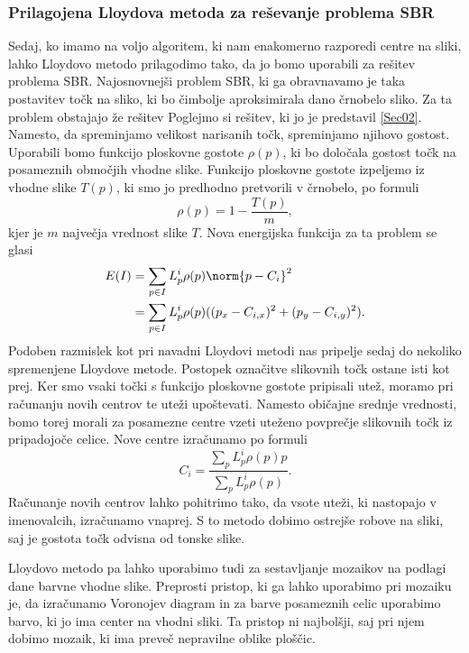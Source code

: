 \subsubsection{Prilagojena Lloydova metoda za reševanje problema SBR}
Sedaj, ko imamo na voljo algoritem, ki nam enakomerno razporedi centre na sliki, lahko Lloydovo metodo prilagodimo tako, da jo bomo uporabili za rešitev problema SBR. Najosnovnejši problem SBR, ki ga obravnavamo je taka postavitev točk na sliko, ki bo čimbolje aproksimirala dano črnobelo sliko. Za ta problem obstajajo že rešitev %
Poglejmo si rešitev, ki jo je predstavil \ref{Sec02}. Namesto, da spreminjamo velikost narisanih točk, spreminjamo njihovo gostost. Uporabili bomo funkcijo ploskovne gostote $\rho(p)$, ki bo določala gostost točk na posameznih območjih vhodne slike. Funkcijo ploskovne gostote izpeljemo iz vhodne slike $T(p)$, ki smo jo predhodno pretvorili v črnobelo, po formuli
$$\rho(p) = 1 - \frac{T(p)}{m},$$
kjer je $m$ največja vrednost slike $T$. Nova energijska funkcija za ta problem se glasi
%
\begin{align*}
E(I) & = \sum_{p \in I} L_p^i \rho(p) \norm{p - C_i}^2 \\
       & = \sum_{p \in I} L_p^i \rho(p) ((p_x - C_{i, x})^2 + (p_y - C_{i, y})^2).
\end{align*}
%
Podoben razmislek kot pri navadni Lloydovi metodi nas pripelje sedaj do nekoliko spremenjene Lloydove metode. Postopek označitve slikovnih točk ostane isti kot prej. Ker smo vsaki točki s funkcijo ploskovne gostote pripisali utež, moramo pri računanju novih centrov te uteži upoštevati. Namesto običajne srednje vrednosti, bomo torej morali za posamezne centre vzeti uteženo povprečje slikovnih točk iz pripadojoče celice. Nove centre izračunamo po formuli
%
$$C_i = \frac{\sum_p L_p^i \rho(p)p}{\sum_p L_p^i \rho(p)}.$$
%
Računanje novih centrov lahko pohitrimo tako, da vsote uteži, ki nastopajo v imenovalcih, izračunamo vnaprej. S to metodo dobimo ostrejše robove na sliki, saj je gostota točk odvisna od tonske slike. %

Lloydovo metodo pa lahko uporabimo tudi za sestavljanje mozaikov na podlagi dane barvne vhodne slike. Preprosti pristop, ki ga lahko uporabimo pri mozaiku je, da izračunamo Voronojev diagram in za barve posameznih celic uporabimo barvo, ki jo ima center na vhodni sliki. Ta pristop ni najbolšji, saj pri njem dobimo mozaik, ki ima preveč nepravilne oblike ploščic.

